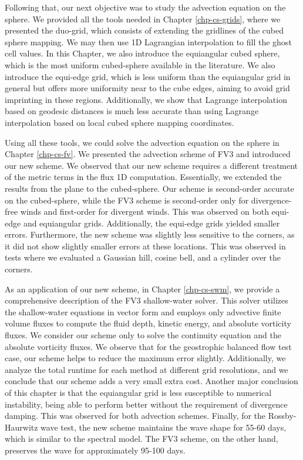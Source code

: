 Following that, our next objective was to study the advection equation on the sphere. 
We provided all the tools needed in Chapter \ref{chp-cs-grids}, 
where we presented the duo-grid, which consists of extending the gridlines of the cubed sphere mapping. 
We may then use 1D Lagrangian interpolation to fill the ghost cell values.
In this Chapter, we also introduce the equiangular cubed sphere, which is the most uniform cubed-sphere available in the literature.
We also introduce the equi-edge grid, which is less uniform than the equiangular grid in general but offers more uniformity near to the cube edges,
aiming to avoid grid imprinting in these regions.
Additionally, we show that Lagrange interpolation based on geodesic distances 
is much less accurate than using Lagrange interpolation based on local cubed sphere mapping coordinates.

Using all these tools, we could solve the advection equation on the sphere in Chapter \ref{chp-cs-fv}.
We presented the advection scheme of FV3 and introduced our new scheme. We observed that our new scheme
requires a different treatment of the metric terms in the flux 1D computation.
Essentially, we extended the results from the plane to the cubed-sphere.
Our scheme is second-order accurate on the cubed-sphere, 
while the FV3 scheme is second-order only for divergence-free winds and first-order for divergent winds.
This was observed on both equi-edge and equiangular grids. Additionally, the equi-edge grids yielded smaller errors.
Furthermore, the new scheme was slightly less sensitive to the corners, as it did not show slightly smaller errors at these locations. 
This was observed in tests where we evaluated a Gaussian hill, cosine bell, and a cylinder over the corners.

As an application of our new scheme, in Chapter \ref{chp-cs-swm}, we provide a comprehensive description of the FV3 shallow-water solver.
This solver utilizes the shallow-water equations in vector form and employs only advective finite volume fluxes
to compute the fluid depth, kinetic energy, and absolute vorticity fluxes. 
We consider our scheme only to solve the continuity equation and the absolute vorticity fluxes.
We observe that for the geostrophic balanced flow test case, our scheme helps to reduce the maximum error slightly.
Additionally, we analyze the total runtime for each method at different grid resolutions, and we conclude that our scheme adds a very small extra cost.
{Another major conclusion of this chapter is that the equiangular grid is less susceptible to numerical instability,
being able to perform better without the requirement of divergence damping.
This was observed for both advection schemes.
Finally, for the Rossby-Haurwitz wave test, the new scheme maintains the wave shape for 55-60 days, which is similar to the spectral model. The FV3 scheme, on the other hand, preserves the wave for approximately 95-100 days.}

